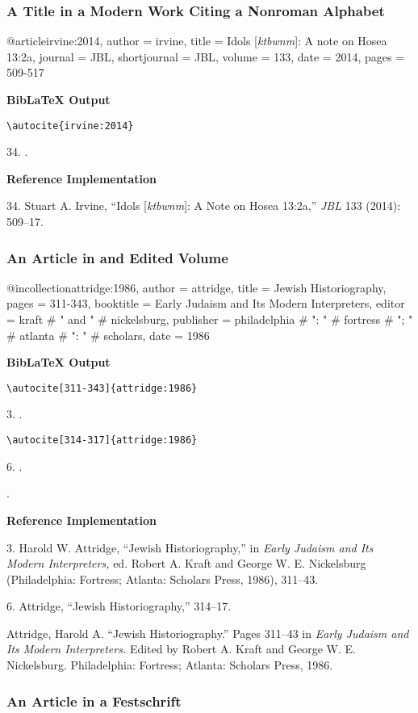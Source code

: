 \documentclass[a4paper]{article}
\newcommand\citetest[5]{%
  {\textbf{BibLaTeX Output}\par
   \nobreak
   \texttt{\textbackslash autocite[#2]\{#5\}}\par
   \color{biblatex-colour}
   #1. \cite[#2]{#5}.\par
   \color{black}
   \texttt{\textbackslash autocite[#4]\{#5\}}\par
   \color{biblatex-colour}
   #3. \cite[#4]{#5}.\par
   \hangindent\bibindent\bibentrycite{#5}.\par}}
\newcommand\citetestnsnpnb[2]{%
  {\textbf{BibLaTeX Output}\par
   \nobreak
   \texttt{\textbackslash autocite\{#2\}}\par
   \color{biblatex-colour}
   #1. \cite{#2}.\par}}
\newenvironment{refimp}{%
  \begin{minipage}{\linewidth}
    \setlength{\parskip}{1ex}
    \textbf{Reference Implementation}\par
    \nobreak
    \color{reference-colour}
}{\end{minipage}}
\newenvironment{vb}{%
  \setlength{\parskip}{0pt}
  \verbatim}{\endverbatim}
\begin{document}
\subsubsection{A Title in a Modern Work Citing a Nonroman Alphabet}

\begin{vb}
@article{irvine:2014,
  author = irvine,
  title = {Idols [\emph{ktbwnm}]: A note on Hosea 13:2a},
  journal = JBL,
  shortjournal = {JBL},
  volume = {133},
  date = {2014},
  pages = {509-517}
}
\end{vb}

\citetestnsnpnb{34}{irvine:2014}

\begin{refimp}
  34. Stuart A. Irvine, “Idols [\emph{ktbwnm}]: A Note on Hosea 13:2a,”
  \emph{JBL} 133 (2014): 509–17.
\end{refimp}

\subsubsection{An Article in and Edited Volume}

\begin{vb}
@incollection{attridge:1986,
  author = attridge,
  title = {Jewish Historiography},
  pages = {311-343},
  booktitle = {Early Judaism and Its Modern Interpreters},
  editor = kraft # " and " # nickelsburg,
  publisher = philadelphia # ": " # fortress # "; " #
              atlanta # ": " # scholars,
  date = {1986}
}
\end{vb}  

\citetest{3}{311-343}{6}{314-317}{attridge:1986}

\begin{refimp}
  3. Harold W. Attridge, “Jewish Historiography,” in \emph{Early Judaism and
  Its Modern Interpreters,} ed. Robert A. Kraft and George W. E. Nickelsburg
  (Philadelphia: Fortress; Atlanta: Scholars Press, 1986), 311–43.
  
  6. Attridge, “Jewish Historiography,” 314–17.

  Attridge, Harold A. “Jewish Historiography.” Pages 311–43 in \emph{Early
  Judaism and Its Modern Interpreters.} Edited by Robert A. Kraft and George
  W. E. Nickelsburg. Philadelphia: Fortress; Atlanta: Scholars Press, 1986.
\end{refimp}

\subsubsection{An Article in a Festschrift}
\end{document}
